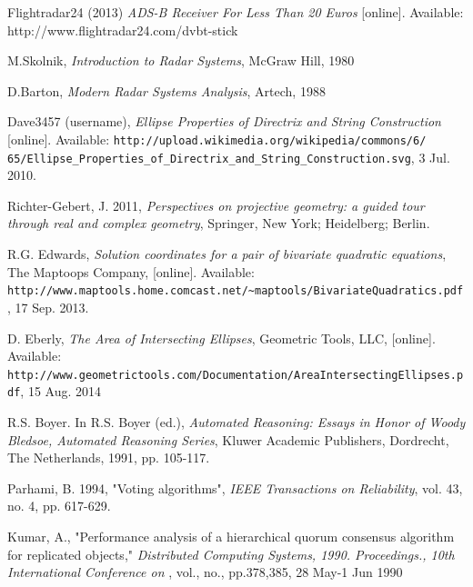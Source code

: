 \documentclass[12pt,openany,a4paper]{book}
\begin{document}
\begin{thebibliography}{99}
 Flightradar24 (2013) \emph{ADS-B Receiver For Less Than 20 Euros} [online]. Available: http://www.flightradar24.com/dvbt-stick

 M.Skolnik, \emph{Introduction to Radar Systems}, McGraw Hill, 1980

 D.Barton, \emph{Modern Radar Systems Analysis}, Artech, 1988

 Dave3457 (username), \emph{Ellipse Properties of Directrix and String Construction} [online]. Available: \verb+http://upload.wikimedia.org/wikipedia/commons/6/+
\verb+65/Ellipse_Properties_of_Directrix_and_String_Construction.svg+, 3 Jul. 2010.

 Richter-Gebert, J. 2011, \emph{Perspectives on projective geometry: a guided tour through real and complex geometry}, Springer, New York; Heidelberg; Berlin.

 R.G. Edwards, \emph{Solution coordinates for a pair of bivariate quadratic equations}, The Maptoops Company, [online]. Available: \verb+http://www.maptools.home.comcast.net/~maptools/BivariateQuadratics.pdf+, 17 Sep. 2013.

 D. Eberly, \emph{The Area of Intersecting Ellipses}, Geometric Tools, LLC, [online]. Available: \verb+http://www.geometrictools.com/Documentation/AreaIntersectingEllipses.pdf+, 15 Aug. 2014

 R.S. Boyer. In R.S. Boyer (ed.), \emph{Automated Reasoning: Essays in Honor of Woody Bledsoe, Automated Reasoning Series}, Kluwer Academic Publishers, Dordrecht, The Netherlands, 1991, pp. 105-117.

 Parhami, B. 1994, "Voting algorithms", \emph{IEEE Transactions on Reliability}, vol. 43, no. 4, pp. 617-629.

 Kumar, A., "Performance analysis of a hierarchical quorum consensus algorithm for replicated objects," \emph{Distributed Computing Systems, 1990. Proceedings., 10th International Conference on} , vol., no., pp.378,385, 28 May-1 Jun 1990

\end{thebibliography}
\end{document}
